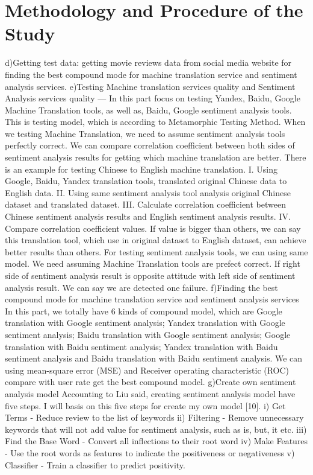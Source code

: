 \documentclass[conference,compsoc]{IEEEtran}
\begin{document}
\section{Methodology and Procedure of the Study}
d)Getting test data: getting movie reviews data from social media website for finding the best compound mode for machine translation service and sentiment analysis services.
e)Testing Machine translation services quality and Sentiment Analysis services quality --- In this part focus on testing Yandex, Baidu, Google Machine Translation tools, as well as, Baidu, Google sentiment analysis tools. This is testing model, which is according to Metamorphic Testing Method. When we testing Machine Translation, we need to assume sentiment analysis tools perfectly correct. We can compare correlation coefficient between both sides of sentiment analysis results for getting which machine translation are better. There is an example for testing Chinese to English machine translation.
I.	Using Google, Baidu, Yandex translation tools, translated original Chinese data to English data.
II.	Using same sentiment analysis tool analysis original Chinese dataset and translated dataset.
III.	Calculate correlation coefficient between Chinese sentiment analysis results and English sentiment analysis results.
IV.	Compare correlation coefficient values. If value is bigger than others, we can say this translation tool, which use in original dataset to English dataset, can achieve better results than others.
For testing sentiment analysis tools, we can using same model. We need assuming Machine Translation tools are prefect correct. If right side of sentiment analysis result is opposite attitude with left side of sentiment analysis result. We can say we are detected one failure.
f)Finding the best compound mode for machine translation service and sentiment analysis services In this part, we totally have 6 kinds of compound model, which are Google translation with Google sentiment analysis; Yandex translation with Google sentiment analysis; Baidu translation with Google sentiment analysis; Google translation with Baidu sentiment analysis; Yandex translation with Baidu sentiment analysis and Baidu translation with Baidu sentiment analysis. We can using mean-square error (MSE) and Receiver operating characteristic (ROC) compare with user rate get the best compound model.
g)Create own sentiment analysis model Accounting to Liu said, creating sentiment analysis model have five steps. I will basis on this five steps for create my own model [10].
i) Get Terms - Reduce review to the list of keywords
ii) Filtering - Remove unnecessary keywords that will not add value for sentiment analysis, such as is, but, it etc.
iii) Find the Base Word - Convert all inflections to their root word
iv) Make Features - Use the root words as features to indicate the positiveness or negativeness
v) Classifier - Train a classifier to predict positivity.
\end{document}
